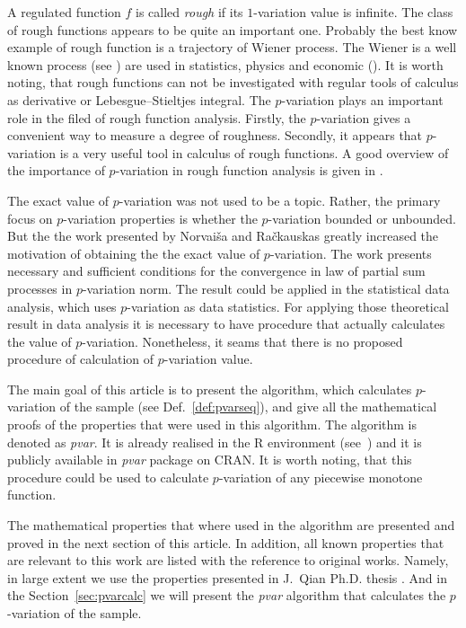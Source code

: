 \documentclass[12pt, a4paper]{article}
\numberwithin{equation}{section}
\begin{document}
A regulated function $f$ is called \emph{rough}
if its $1$-variation value is infinite.
The class of rough functions appears to be quite an important one.
Probably the best know example of rough function is 
a trajectory of Wiener process. 
The Wiener is a well known process (see \cite{Karatsas1997}) 
are used in statistics, physics and economic (\cite{Econ1997}).
It is worth noting, that rough functions can not be investigated 
with regular tools of calculus as derivative or Lebesgue–Stieltjes integral.
The $p$-variation plays an important role in the filed of
rough function analysis. 
Firstly, the $p$-variation gives a convenient way to measure 
a degree of roughness. 
Secondly, it appears that $p$-variation is a very useful tool 
in calculus of rough functions.
A good overview of the importance of $p$-variation in rough function
analysis is given in \cite{Norvaisa2005}.
 
  
The exact value of $p$-variation was not used to be a topic.
Rather, the primary focus on $p$-variation properties 
is whether the $p$-variation bounded or unbounded. 
But the the work \cite{NorvaisaRackauskas2008} presented by
Norvaiša and Račkauskas greatly increased the motivation
of obtaining the the exact value of $p$-variation.
The work \cite{NorvaisaRackauskas2008} presents
necessary and sufficient conditions
for the convergence in law of partial sum processes in
$p$-variation norm. 
The result could be applied in the statistical data analysis,
which uses $p$-variation as data statistics.
For applying those theoretical result in data analysis it is necessary
to have procedure that actually calculates the value of $p$-variation.
Nonetheless, it seams that there is no proposed 
procedure of calculation of $p$-variation value.

The main goal of this article is to present the algorithm,
which calculates $p$-variation of the sample
(see Def.~\ref{def:pvarseq}), and give all the mathematical proofs
of the properties that were used in this algorithm.
The algorithm is denoted as \emph{pvar}.
It is already realised in the R environment (see~\cite{R})
and it is publicly available in \emph{pvar} package on CRAN\footnotemark.
It is worth noting, that this procedure could be used to calculate
$p$-variation of any piecewise monotone function.

The mathematical properties that where used in the
algorithm are presented and proved in the next section of this article.
In addition, all known properties that are relevant to this work
are listed with the reference to original works. Namely, in large extent
we use the properties presented in J.~Qian Ph.D. thesis \cite{Qian}\footnotemark.
And in the Section~\ref{sec:pvarcalc} we will present the \emph{pvar}
algorithm that calculates the $p$-variation of the sample.
\end{document}
